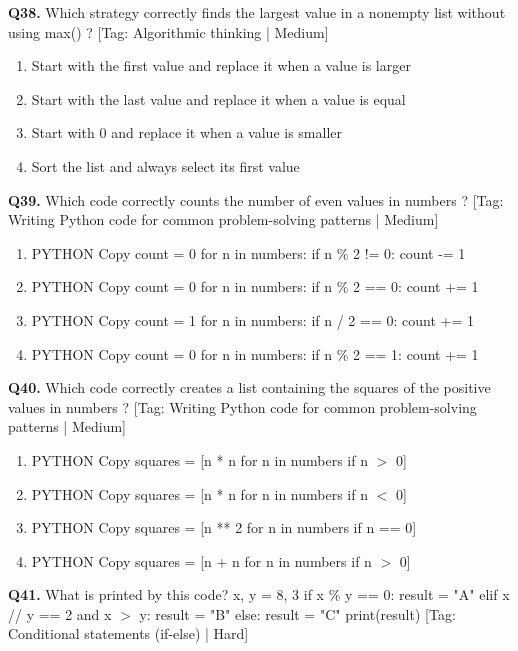 \noindent\textbf{Q38.} Which strategy correctly finds the largest value in a nonempty list without using max() ? \hfill [Tag: Algorithmic thinking | Medium]
\begin{enumerate}[label=(\alph*),topsep=2pt,itemsep=1pt,partopsep=0pt,parsep=0pt]
    \item {Start with the first value and replace it when a value is larger}
    \item {Start with the last value and replace it when a value is equal}
    \item {Start with 0 and replace it when a value is smaller}
    \item {Sort the list and always select its first value}
\end{enumerate}
\vspace{2mm}
\noindent\textbf{Q39.} Which code correctly counts the number of even values in numbers ? \hfill [Tag: Writing Python code for common problem-solving patterns | Medium]
\begin{enumerate}[label=(\alph*),topsep=2pt,itemsep=1pt,partopsep=0pt,parsep=0pt]
    \item {PYTHON Copy count = 0 for n in numbers: if n \% 2 != 0: count -= 1}
    \item {PYTHON Copy count = 0 for n in numbers: if n \% 2 == 0: count += 1}
    \item {PYTHON Copy count = 1 for n in numbers: if n / 2 == 0: count += 1}
    \item {PYTHON Copy count = 0 for n in numbers: if n \% 2 == 1: count += 1}
\end{enumerate}
\vspace{2mm}
\noindent\textbf{Q40.} Which code correctly creates a list containing the squares of the positive values in numbers ? \hfill [Tag: Writing Python code for common problem-solving patterns | Medium]
\begin{enumerate}[label=(\alph*),topsep=2pt,itemsep=1pt,partopsep=0pt,parsep=0pt]
    \item {PYTHON Copy squares = [n * n for n in numbers if n $>$ 0]}
    \item {PYTHON Copy squares = [n * n for n in numbers if n $<$ 0]}
    \item {PYTHON Copy squares = [n ** 2 for n in numbers if n == 0]}
    \item {PYTHON Copy squares = [n + n for n in numbers if n $>$ 0]}
\end{enumerate}
\vspace{2mm}
\noindent\textbf{Q41.} What is printed by this code? x, y = 8, 3 if x \% y == 0: result = "A" elif x // y == 2 and x $>$ y: result = "B" else: result = "C" print(result) \hfill [Tag: Conditional statements (if-else) | Hard]
